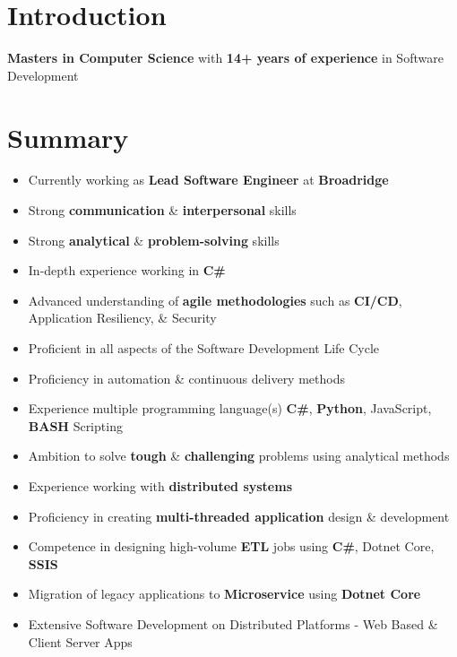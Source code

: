 \documentclass[letterpaper,11pt]{article}
\begin{document}
\section{Introduction}
\textbf{\color{darkgray}Masters in Computer Science} with \textbf{\color{darkgray}14+ years of experience} in Software Development

\section{Summary}
\begin{itemize}
    \item Currently working as \textbf{\color{darkgray}Lead Software Engineer} at \textbf{\color{darkgray}Broadridge}
    \item Strong \textbf{\color{darkgray}communication} \& \textbf{\color{darkgray}interpersonal} skills
    \item Strong \textbf{\color{darkgray}analytical} \& \textbf{\color{darkgray}problem-solving} skills
    \item In-depth experience working in \textbf{\color{darkgray}C\#}
    \item Advanced understanding of \textbf{\color{darkgray}agile methodologies} such as \textbf{\color{darkgray}CI/CD}, Application Resiliency, \& Security
    \item Proficient in all aspects of the Software Development Life Cycle
    \item Proficiency in automation \& continuous delivery methods
    \item Experience multiple programming language(s) \textbf{\color{darkgray}C\#}, \textbf{\color{darkgray}Python}, JavaScript, \textbf{\color{darkgray}BASH} Scripting
    \item Ambition to solve \textbf{\color{darkgray}tough} \& \textbf{\color{darkgray}challenging} problems using analytical methods
    \item Experience working with \textbf{\color{darkgray}distributed systems}
    \item Proficiency in creating \textbf{\color{darkgray}multi-threaded application} design \& development
    \item Competence in designing high-volume \textbf{\color{darkgray}ETL} jobs using \textbf{\color{darkgray}C\#}, Dotnet Core, \textbf{\color{darkgray}SSIS}
    \item Migration of legacy applications to \textbf{\color{darkgray}Microservice} using \textbf{\color{darkgray}Dotnet Core}
    \item Extensive Software Development on Distributed Platforms - Web Based \& Client Server Apps

\end{itemize}
\end{document}
